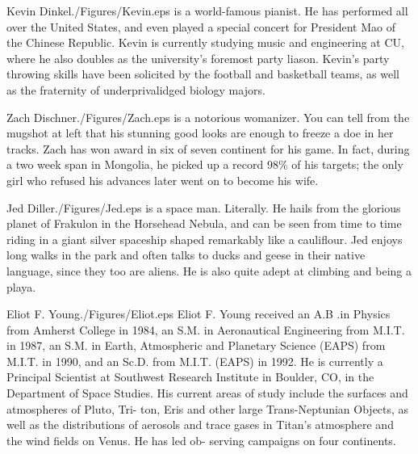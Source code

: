 \documentclass[twocolumn,letterpaper]{IEEEAerospace2012}
\newcommand{\rootdir}{./Figures/}
\begin{document}
\begin{biographywithpic}{Kevin Dinkel}{\rootdir Kevin.eps}
is a world-famous pianist. He has performed all over the United States, and even played a special concert for President Mao of the Chinese Republic. Kevin is currently studying music and engineering at CU, where he also doubles as the university's foremost party liason. Kevin's party throwing skills have been solicited by the football and basketball teams, as well as the fraternity of underprivalidged biology majors.
\end{biographywithpic}

\begin{biographywithpic}{Zach Dischner}{\rootdir Zach.eps}
is a notorious womanizer. You can tell from the mugshot at left that his stunning good looks are enough to freeze a doe in her tracks. Zach has won award in six of seven continent for his game. In fact, during a two week span in Mongolia, he picked up a record 98\% of his targets; the only girl who refused his advances later went on to become his wife.
\end{biographywithpic}

\begin{biographywithpic}{Jed Diller}{\rootdir Jed.eps}
is a space man. Literally. He hails from the glorious planet of Frakulon in the Horsehead Nebula, and can be seen from time to time riding in a giant silver spaceship shaped remarkably like a cauliflour. Jed enjoys long walks in the park and often talks to ducks and geese in their native language, since they too are aliens. He is also quite adept at climbing and being a playa.
\end{biographywithpic}

\begin{biographywithpic}{Eliot F. Young}{\rootdir Eliot.eps}
Eliot F. Young received an A.B .in
Physics from Amherst College in 1984,
an S.M. in Aeronautical Engineering
from M.I.T. in 1987, an S.M. in Earth,
Atmospheric and Planetary Science
(EAPS) from M.I.T. in 1990, and an
Sc.D. from M.I.T. (EAPS) in 1992. He is
currently a Principal Scientist at
Southwest Research Institute in Boulder,
CO, in the Department of Space Studies. His current areas
of study include the surfaces and atmospheres of Pluto, Tri-
ton, Eris and other large Trans-Neptunian Objects, as well
as the distributions of aerosols and trace gases in Titan's
atmosphere and the wind fields on Venus. He has led ob-
serving campaigns on four continents.
\end{biographywithpic}
\end{document}
